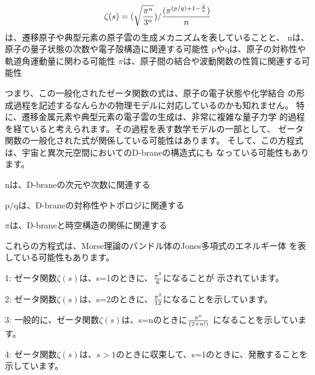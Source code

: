 \documentclass{jsarticle}
\begin{document}
$$\zeta(s) = {(\sqrt{\pi^n \over 3^{n}}) / {(\pi^{(p/q) +1-{2 \over \pi}})
\over n}} $$
は、遷移原子や典型元素の原子雲の生成メカニズムを表していることと、
nは、原子の量子状態の次数や電子殻構造に関連する可能性
pやqは、原子の対称性や軌道角運動量に関わる可能性
$\pi$は、原子間の結合や波動関数の性質に関連する可能性

つまり、この一般化されたゼータ関数の式は、原子の電子状態や化学結合
の形成過程を記述するなんらかの物理モデルに対応しているのかも知れません。
特に、遷移金属元素や典型元素の電子雲の生成は、非常に複雑な量子力学
的過程を経ていると考えられます。その過程を表す数学モデルの一部として、
ゼータ関数の一般化された式が関係している可能性はあります。
そして、この方程式は、宇宙と異次元空間においてのD-braneの構造式にも
なっている可能性もあります。


nは、D-braneの次元や次数に関連する


p/qは、D-braneの対称性やトポロジに関連する


$\pi$は、D-braneと時空構造の関係に関連する

これらの方程式は、Morse理論のバンドル体のJones多項式のエネルギー体
を表している可能性もあります。



1: ゼータ関数$\zeta(s)$は、s=1のときに、${\pi^2 \over 6}$になることが
示されています。


2:  ゼータ関数$\zeta(s)$は、s=2のときに、${\pi^2 \over 12}$になることを示しています。



3: 一般的に、ゼータ関数$\zeta(s)$は、s=nのときに${\pi^n \over {(2\times n!)}}$
になることを示しています。


4: ゼータ関数$\zeta(s)$は、$s>1$のときに収束して、s=1のときに、発散することを
示しています。
\end{document}
